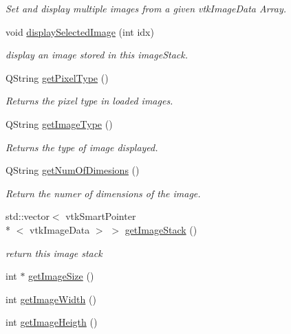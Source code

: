 \begin{DoxyCompactItemize}
\begin{DoxyCompactList}\small\item\em Set and display multiple images from a given vtk\-Image\-Data Array. \end{DoxyCompactList}\item 
void \hyperlink{class_q_v_t_k_image_widget_a74232311be68637533974b68b4d63bc5}{display\-Selected\-Image} (int idx)
\begin{DoxyCompactList}\small\item\em display an image stored in this image\-Stack. \end{DoxyCompactList}\item 
Q\-String \hyperlink{class_q_v_t_k_image_widget_acb6c70c4b6e1394b0054d0902e72fcbf}{get\-Pixel\-Type} ()
\begin{DoxyCompactList}\small\item\em Returns the pixel type in loaded images. \end{DoxyCompactList}\item 
Q\-String \hyperlink{class_q_v_t_k_image_widget_af0626a3fda57807caecbbe115e95d409}{get\-Image\-Type} ()
\begin{DoxyCompactList}\small\item\em Returns the type of image displayed. \end{DoxyCompactList}\item 
Q\-String \hyperlink{class_q_v_t_k_image_widget_ac1b3215b0360177a7dfaad8461f42790}{get\-Num\-Of\-Dimesions} ()
\begin{DoxyCompactList}\small\item\em Return the numer of dimensions of the image. \end{DoxyCompactList}\item 
std\-::vector$<$ vtk\-Smart\-Pointer\\*
$<$ vtk\-Image\-Data $>$ $>$ \hyperlink{class_q_v_t_k_image_widget_a912b460d82be67f391cb1375429ffea7}{get\-Image\-Stack} ()
\begin{DoxyCompactList}\small\item\em return this image stack \end{DoxyCompactList}\item 
int $\ast$ \hyperlink{class_q_v_t_k_image_widget_aa2dc225bbfe290f57b0c61bde02566a8}{get\-Image\-Size} ()
\item 
int \hyperlink{class_q_v_t_k_image_widget_a73a82e34e589dc83bc98ea482ac49f53}{get\-Image\-Width} ()
\item 
int \hyperlink{class_q_v_t_k_image_widget_afbaa4d7a3881794acaef89eab7ad23ec}{get\-Image\-Heigth} ()

\end{DoxyCompactItemize}
